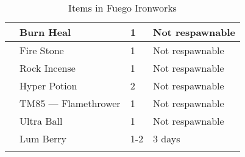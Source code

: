 \begin{longtable}{|| l l l l ||}%
\hline%
&Burn Heal&1&Not respawnable\\%
\hline%
&Fire Stone&1&Not respawnable\\%
\hline%
&Rock Incense&1&Not respawnable\\%
\hline%
&Hyper Potion&2&Not respawnable\\%
\hline%
&TM85 — Flamethrower&1&Not respawnable\\%
\hline%
&Ultra Ball&1&Not respawnable\\%
\hline%
&Lum Berry&1{-}2&3 days\\%
\hline%
\endhead%
\hline%
\caption{Items in Fuego Ironworks}%
\label{tab:FuegoIronworksItems}%
\end{longtable}